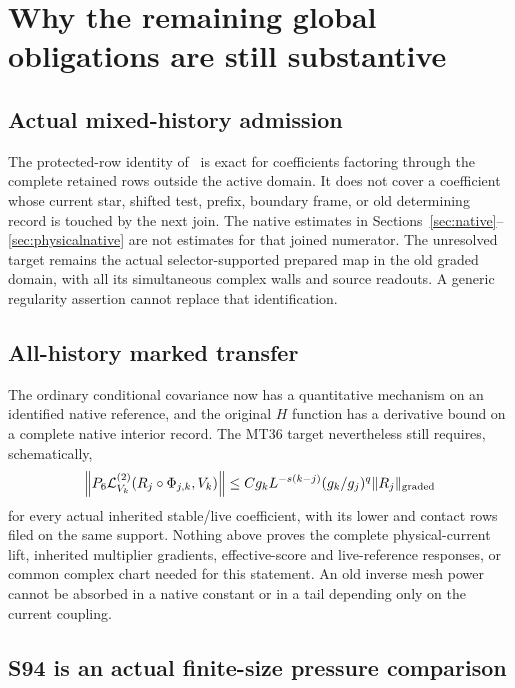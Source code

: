 \documentclass[11pt,letterpaper]{article}
\numberwithin{equation}{section}
\theoremstyle{plain}
\theoremstyle{remark}
\begin{document}
\section{Why the remaining global obligations are still substantive}

\subsection{Actual mixed-history admission}

The protected-row identity of~\cite[pp.~1174--1180]{W} is exact for coefficients factoring
through the complete retained rows outside the active domain. It does not
cover a coefficient whose current star, shifted test, prefix, boundary frame,
or old determining record is touched by the next join. The native estimates
in Sections~\ref{sec:native}--\ref{sec:physicalnative} are not estimates for
that joined numerator. The unresolved target remains the actual
selector-supported prepared map in the old graded domain, with all its
simultaneous complex walls and source readouts. A generic regularity assertion
cannot replace that identification.

\subsection{All-history marked transfer}

The ordinary conditional covariance now has a quantitative mechanism on an
identified native reference, and the original $H$ function has a derivative
bound on a complete native interior record. The MT36 target nevertheless
still requires, schematically,
\begin{equation}
 \left\|P_6\mathcal L_{V_k}^{(2)}
       (R_j\circ\Phi_{j,k},V_k)\right\|
 \le Cg_kL^{-s(k-j)}(g_k/g_j)^q\|R_j\|_{\rm graded}
 \label{eq:MT}
\end{equation}
for every actual inherited stable/live coefficient, with its lower and
contact rows filed on the same support. Nothing above proves the complete
physical-current lift, inherited multiplier gradients, effective-score and
live-reference responses, or common complex chart needed for this statement.
An old inverse mesh power cannot be absorbed in a native constant or in a
tail depending only on the current coupling.

\subsection{S94 is an actual finite-size pressure comparison}
\end{document}
